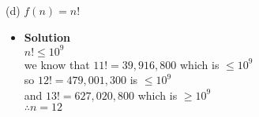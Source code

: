 \documentclass[11pt]{article}
\begin{document}
\begin{enumerate}
\begin{itemize}
\end {itemize}


\large (d) $f(n) = n!$\\


\begin{itemize}

\item \textbf{Solution}\\
\large  $n! \leq 10^9$\\
\large we know that $11! = 39,916,800$ which is $\leq 10^9$\\
\large so $12! = 479,001,300$ is $\leq 10^9$\\
\large and $13! = 627,020,800$ which is $\geq 10^9$\\
\large $\therefore n = 12$\\


\end {itemize}








\end {enumerate}
\end{document}
